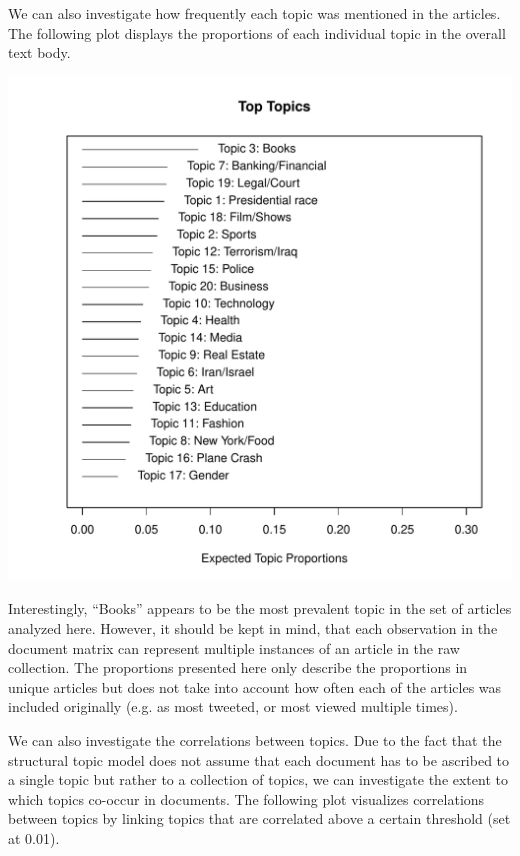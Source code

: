\documentclass[12pt]{article}\usepackage[]{graphicx}\usepackage[]{color}
\makeatletter
\def\maxwidth{ %
  \ifdim\Gin@nat@width>\linewidth
    \linewidth
  \else
    \Gin@nat@width
  \fi
}
\newenvironment{knitrout}{}{} %
\makeatother
\begin{document}
We can also investigate how frequently each topic was mentioned in the articles. The following plot displays the proportions of each individual topic in the overall text body.

\begin{knitrout}
\color{fgcolor}
\includegraphics[width=\maxwidth]{figure/unnamed-chunk-4-1} 

\end{knitrout}

Interestingly, ``Books'' appears to be the most prevalent topic in the set of articles analyzed here. However, it should be kept in mind, that each observation in the document matrix can represent multiple instances of an article in the raw collection. The proportions presented here only describe the proportions in unique articles but does not take into account how often each of the articles was included originally (e.g. as most tweeted, or most viewed multiple times). 

We can also investigate the correlations between topics. Due to the fact that the structural topic model does not assume that each document has to be ascribed to a single topic but rather to a collection of topics, we can investigate the extent to which topics co-occur in documents. The following plot visualizes correlations between topics by linking topics that are correlated above a certain threshold (set at 0.01).
\end{document}
